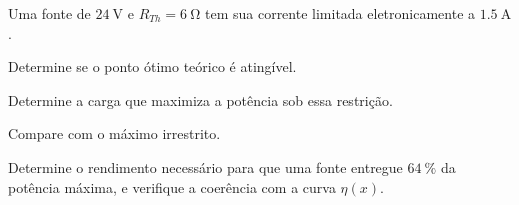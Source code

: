 \begin{questao}[3]{}

Uma fonte de $\SI{24}{\volt}$ e $R_{Th}=\SI{6}{\ohm}$ tem sua corrente limitada
eletronicamente a $\SI{1.5}{\ampere}$.
\begin{itensq}
\item Determine se o ponto ótimo teórico é atingível.
\item Determine a carga que maximiza a potência sob essa restrição.
\item Compare com o máximo irrestrito.
\end{itensq}


\end{questao}
\begin{questao}[3]{}

Determine o rendimento necessário para que uma fonte entregue $\SI{64}{\percent}$
da potência máxima, e verifique a coerência com a curva $\eta(x)$.


\end{questao}

